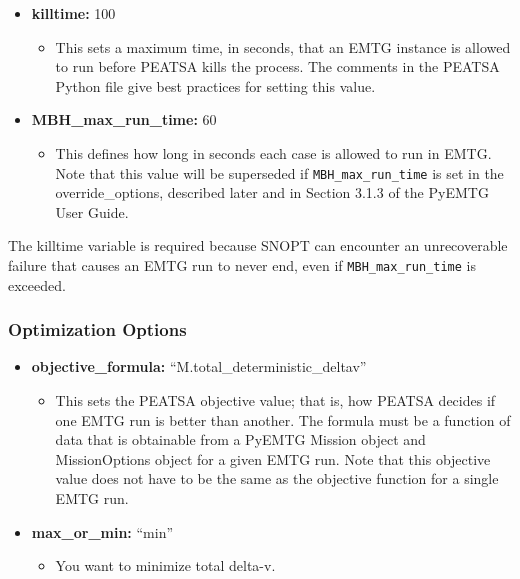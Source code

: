 \documentclass[11pt]{article}
\begin{document}
\begin{itemize}
	\item\textbf{killtime:} 100 
	\begin{itemize}
		\item This sets a maximum time, in seconds, that an \ac{EMTG} instance is allowed to run before \ac{PEATSA} kills the process. The comments in the \ac{PEATSA} Python file give best practices for setting this value.
	\end{itemize}
	\item\textbf{MBH\_max\_run\_time:} 60
	\begin{itemize}
		\item This defines how long in seconds each case is allowed to run in \ac{EMTG}. Note that this value will be superseded if \texttt{MBH\_max\_run\_time} is set in the override\_options, described later and in Section 3.1.3 of the PyEMTG User Guide.
	\end{itemize}
\end{itemize}

\noindent The killtime variable is required because \ac{SNOPT} can encounter an unrecoverable failure that causes an \ac{EMTG} run to never end, even if \texttt{MBH\_max\_run\_time} is exceeded.

\subsubsection{Optimization Options}
\label{sec:optimization_options}

\begin{itemize}
	\item\textbf{objective\_formula:} ``M.total\_deterministic\_deltav''
	\begin{itemize}
		\item This sets the \ac{PEATSA} objective value; that is, how \ac{PEATSA} decides if one \ac{EMTG} run is better than another. The formula must be a function of data that is obtainable from a PyEMTG Mission object and MissionOptions object for a given \ac{EMTG} run. Note that this objective value does not have to be the same as the objective function for a single \ac{EMTG} run.
	\end{itemize}
	\item\textbf{max\_or\_min:} ``min'' 
	\begin{itemize}
		\item You want to minimize total delta-v.
	\end{itemize}
\end{itemize}
\end{document}
